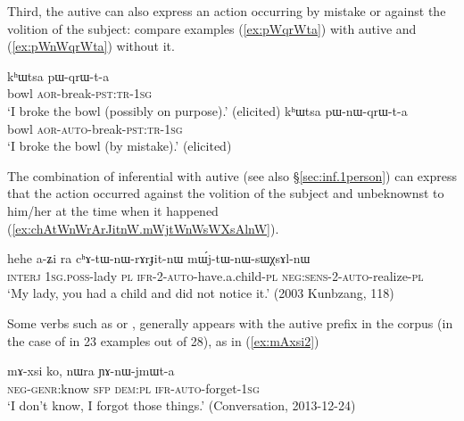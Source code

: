 Third, the autive can also express an action occurring by mistake or against the volition of the subject: compare examples (\ref{ex:pWqrWta}) with autive and (\ref{ex:pWnWqrWta}) without it.

\begin{exe}
\ex 
\begin{xlist}
\ex \label{ex:pWqrWta}
\gll kʰɯtsa pɯ-qrɯ-t-a\\
bowl \textsc{aor}-break-\textsc{pst}:\textsc{tr}-\textsc{1sg} \\
\glt `I broke the bowl (possibly on purpose).' (elicited)
\ex \label{ex:pWnWqrWta}
\gll kʰɯtsa pɯ-nɯ-qrɯ-t-a\\
bowl \textsc{aor}-\textsc{auto}-break-\textsc{pst}:\textsc{tr}-\textsc{1sg} \\
\glt `I broke the bowl (by mistake).' (elicited)
\end{xlist} 
\end{exe}

The combination of inferential with autive (see also §\ref{sec:inf.1person}) can express that the action occurred against the volition of the subject and unbeknownst to him/her at the time when it happened (\ref{ex:chAtWnWrArJitnW.mWjtWnWsWXsAlnW}).

\begin{exe}
\ex \label{ex:chAtWnWrArJitnW.mWjtWnWsWXsAlnW}
\gll hehe a-ʑi ra cʰɤ-tɯ-nɯ-rɤrɟit-nɯ mɯ́j-tɯ-nɯ-sɯχsɤl-nɯ  \\
\textsc{interj} \textsc{1sg}.\textsc{poss}-lady \textsc{pl} \textsc{ifr}-2-\textsc{auto}-have.a.child-\textsc{pl} \textsc{neg}:\textsc{sens}-2-\textsc{auto}-realize-\textsc{pl}  \\
\glt `My lady, you had a child and did not notice it.' (2003 Kunbzang, 118)
\end{exe}

Some verbs such as  or , generally appears with the autive prefix in the corpus (in the case of  in 23 examples out of 28), as in  (\ref{ex:mAxsi2})  
 
\begin{exe}
 \ex \label{ex:mAxsi2}
 \gll mɤ-xsi ko, nɯra ɲɤ-nɯ-jmɯt-a  \\
\textsc{neg}-\textsc{genr}:know \textsc{sfp} \textsc{dem}:\textsc{pl} \textsc{ifr}-\textsc{auto}-forget-\textsc{1sg} \\
\glt `I don't know, I forgot those things.' (Conversation, 2013-12-24)
\end{exe}

